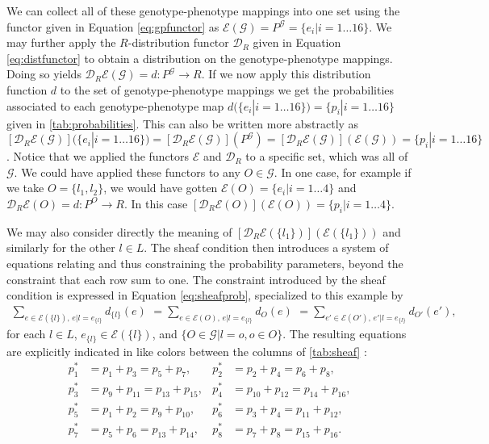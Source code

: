We can collect all of these genotype-phenotype mappings into one set using the functor given in Equation \ref{eq:gpfunctor} as $\mathcal{E}(\mathcal{G}) = P^{\mathcal{G}} = \{e_i | i=1 \ldots 16 \}$. We may further apply the $R$-distribution functor $\mathcal{D}_R$ given in Equation \ref{eq:distfunctor} to obtain a distribution on the genotype-phenotype mappings. Doing so yields  $\mathcal{D}_R\mathcal{E}(\mathcal{G})=d \colon P^\mathcal{G} \rightarrow R$. If we now apply this distribution function $d$ to the set of genotype-phenotype mappings we get the probabilities associated to each genotype-phenotype map $d(\{e_i | i=1 \ldots 16 \}) = \{p_i|i=1 \ldots 16\}$ given in \ref{tab:probabilities}. This can also be written more abstractly as $\left[\mathcal{D}_R\mathcal{E}(\mathcal{G})\right](\{e_i | i=1 \ldots 16 \}) = \left[\mathcal{D}_R\mathcal{E}(\mathcal{G})\right](P^\mathcal{G}) = \left[\mathcal{D}_R\mathcal{E}(\mathcal{G})\right](\mathcal{E}(\mathcal{G})) = \{p_i|i=1 \ldots 16\}$. Notice that we applied the functors $\mathcal{E}$ and $\mathcal{D}_R$ to a specific set, which was all of $\mathcal{G}$. We could have applied these functors to any $O \in \mathcal{G}$. In one case, for example if we take $O = \{l_1, l_2\}$, we would have gotten $\mathcal{E}(O) = \{e_i|i=1 \ldots 4\}$ and $\mathcal{D}_R\mathcal{E}(O) = d \colon P^O \rightarrow R$. In this case $\left[\mathcal{D}_R\mathcal{E}(O)\right](\mathcal{E}(O)) = \{p_i|i=1 \ldots 4\}$.

We may also consider directly the meaning of $\left[\mathcal{D}_R\mathcal{E}(\{l_1\})\right](\mathcal{E}(\{l_1\}))$ and similarly for the other $l \in L$. The sheaf condition then introduces a system of equations relating and thus constraining the probability parameters, beyond the constraint that each row sum to one. The constraint introduced by the sheaf condition is expressed in Equation \ref{eq:sheafprob}, specialized to this example by
\begin{eqnarray}\label{eq:sheafprob2}
\sum_{e \in \mathcal{E}(\{l\}),\, e|l=e_{\{l\}}} d_{\{l\}}(e) \,\, = \sum_{e \in \mathcal{E}(O),\, e|l=e_{\{l\}}} d_O(e) \,\, = \sum_{e' \in \mathcal{E}(O'),\, e'|l=e_{\{l\}}} d_{O'}(e'),
\end{eqnarray}
for each $l \in L$, $e_{\{l\}} \in \mathcal{E}(\{l\})$, and $\{O \in \mathcal{G}|l=o, o \in O\}$. The resulting equations are explicitly indicated in like colors between the columns of \ref{tab:sheaf} :
\begin{equation}
\begin{aligned}\label{eq:pparsys}
p^*_1 &= p_1 + p_3 = p_5 + p_7, &
p^*_2 &= p_2 + p_4 = p_6 + p_8,\\
p^*_3 &= p_9 + p_{11} = p_{13} + p_{15},&
p^*_4 &= p_{10} + p_{12} = p_{14} + p_{16},\\
p^*_5 &= p_1 + p_2 = p_9 + p_{10},&
p^*_6 &= p_3 + p_4 = p_{11} + p_{12},\\
p^*_7 &= p_5 + p_6 = p_{13} + p_{14},&
p^*_8 &= p_7 + p_8 = p_{15} + p_{16}.
\end{aligned}
\end{equation}

